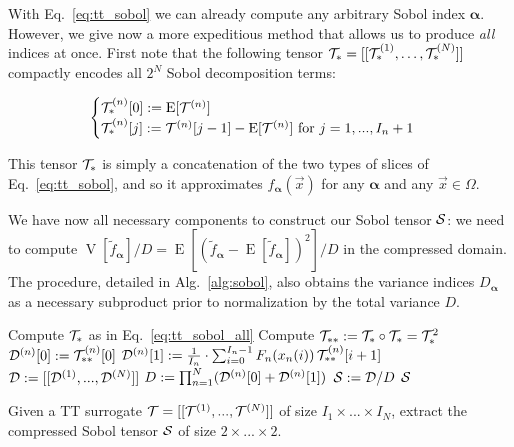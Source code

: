 \documentclass[review, twocolumn]{svjour3}          %
\begin{document}
With Eq.~\ref{eq:tt_sobol} we can already compute any arbitrary Sobol index $\pmb{\alpha}$. However, we give now a more expeditious method that allows us to produce \emph{all} indices at once. First note that the following tensor $\mathcal{T}_* = [[\mathcal{T}^{(1)}_*, \dots, \mathcal{T}^{(N)}_*]]$ compactly encodes all $2^N$ Sobol decomposition terms:

\begin{equation}
\label{eq:tt_sobol_all}
\begin{cases}
\mathcal{T}^{(n)}_*[0] := \operatorname{E}[\mathcal{T}^{(n)}] \\
\mathcal{T}^{(n)}_*[j] := \mathcal{T}^{(n)}[j-1] - \operatorname{E}[\mathcal{T}^{(n)}] \mbox{ for } j = 1, ..., I_n+1
\end{cases}
\end{equation}

This tensor $\mathcal{T}_*$ is simply a concatenation of the two types of slices of Eq.~\ref{eq:tt_sobol}, and so it approximates $f_{\pmb{\alpha}}(\vec{x})$ for any $\pmb{\alpha}$ and any $\vec{x} \in \Omega$.

We have now all necessary components to construct our Sobol tensor $\mathcal{S}$: we need to compute $\operatorname{V}[\tilde{f}_{\pmb{\alpha}}]/D = \operatorname{E}[(\tilde{f}_{\pmb{\alpha}} - \operatorname{E}[\tilde{f}_{\pmb{\alpha}}])^2]/D$ in the compressed domain. The procedure, detailed in Alg.~\ref{alg:sobol}, also obtains the variance indices $D_{\pmb{\alpha}}$ as a necessary subproduct prior to normalization by the total variance $D$.

\begin{algorithm}[h]
\begin{algorithmic}[1]
\STATE Compute $\mathcal{T}_*$ as in Eq.~\ref{eq:tt_sobol_all} 
\STATE Compute $\mathcal{T}_{**} := \mathcal{T}_* \circ \mathcal{T}_* = \mathcal{T}_*^2$ 
	\STATE $\mathcal{D}^{(n)}[0] := \mathcal{T}_{**}^{(n)}[0]$
	\STATE $\mathcal{D}^{(n)}[1] := \frac{1}{I_n} \cdot \sum_{i=0}^{I_n-1} F_n(x_n(i)) \, \mathcal{T}_{**}^{(n)}[i+1]$
\ENDFOR
\STATE $\mathcal{D} := [[\mathcal{D}^{(1)}, ..., \mathcal{D}^{(N)}]]$ 
\STATE $D := \prod_{n=1}^N (\mathcal{D}^{(n)}[0] + \mathcal{D}^{(n)}[1])$ 
\STATE $\mathcal{S} := \mathcal{D} / D$
\RETURN $\mathcal{S}$
\end{algorithmic}
\caption{Given a TT surrogate $\mathcal{T} = [[\mathcal{T}^{(1)}, ..., \mathcal{T}^{(N)}]]$ of size $I_1 \times ... \times I_N$, extract the compressed Sobol tensor $\mathcal{S}$ of size $2 \times ... \times 2$.}
\label{alg:sobol}
\end{algorithm}
\end{document}
